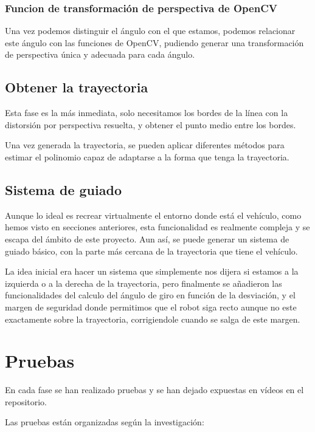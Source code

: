 \subsubsection{Funcion de transformación de perspectiva de OpenCV}

Una vez podemos distinguir el ángulo con el que estamos, podemos relacionar este ángulo con las funciones de OpenCV, pudiendo generar una transformación de perspectiva única y adecuada para cada ángulo.

\subsection{Obtener la trayectoria}
Esta fase es la más inmediata, solo necesitamos los bordes de la línea con la distorsión por perspectiva resuelta, y obtener el punto medio entre los bordes.

Una vez generada la trayectoria, se pueden aplicar diferentes métodos para estimar el polinomio capaz de adaptarse a la forma que tenga la trayectoria.


\subsection{Sistema de guiado}
Aunque lo ideal es recrear virtualmente el entorno donde está el vehículo, como hemos visto en secciones anteriores, esta funcionalidad es realmente compleja y se escapa del ámbito de este proyecto. Aun así, se puede generar un sistema de guiado básico, con la parte más cercana de la trayectoria que tiene el vehículo. 

La idea inicial era hacer un sistema que simplemente nos dijera si estamos a la izquierda o a la derecha de la trayectoria, pero finalmente se añadieron las funcionalidades del calculo del ángulo de giro en función de la desviación, y el margen de seguridad donde permitimos que el robot siga recto aunque no este exactamente sobre la trayectoria, corrigiendole cuando se salga de este margen.

\section{Pruebas}
En cada fase se han realizado pruebas y se han dejado expuestas en vídeos en el repositorio.

Las pruebas están organizadas según la investigación:

